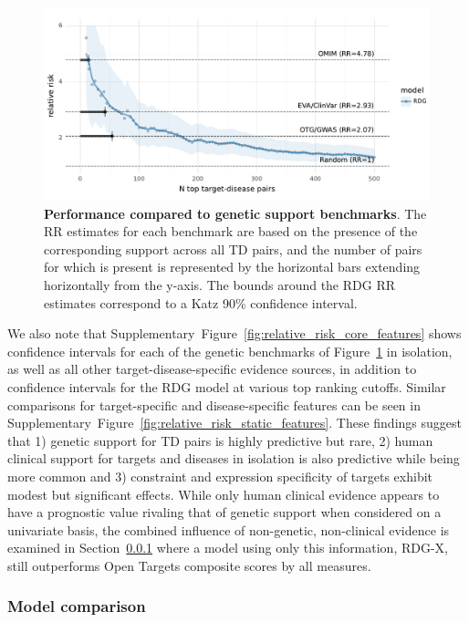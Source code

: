 \documentclass{article}
\begin{document}
\begin{figure}[!htb]
  \centering
  \captionsetup{width=.9\linewidth}
  \includegraphics[width=1\textwidth]{relative_risk_by_limit.pdf}
  \caption{
    \textbf{Performance compared to genetic support benchmarks}. The RR estimates for each benchmark are based on the presence of the corresponding support across all TD pairs, and the number of pairs for which is present is represented by the horizontal bars extending horizontally from the y-axis. The bounds around the RDG RR estimates correspond to a Katz 90\% confidence interval.
  }
  \label{fig:relative_risk_by_limit}
\end{figure}

We also note that Supplementary~Figure~\ref{fig:relative_risk_core_features} shows confidence intervals for each of the genetic benchmarks of Figure~\ref{fig:relative_risk_by_limit} in isolation, as well as all other target-disease-specific evidence sources, in addition to confidence intervals for the RDG model at various top ranking cutoffs. Similar comparisons for target-specific and disease-specific features can be seen in Supplementary~Figure~\ref{fig:relative_risk_static_features}. These findings suggest that 1) genetic support for TD pairs is highly predictive but rare, 2) human clinical support for targets and diseases in isolation is also predictive while being more common and 3) constraint and expression specificity of targets exhibit modest but significant effects. While only human clinical evidence appears to have a prognostic value rivaling that of genetic support when considered on a univariate basis, the combined influence of non-genetic, non-clinical evidence is examined in Section~\ref{sec:model_comparison} where a model using only this information, RDG-X, still outperforms Open Targets composite scores by all measures.

\subsubsection{Model comparison}
\label{sec:model_comparison}
\end{document}

